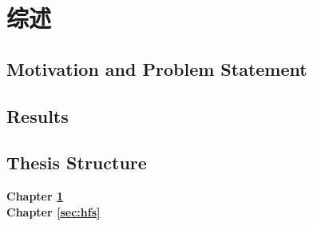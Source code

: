 \chapter{综述}
\label{sec:intro}


\section{Motivation and Problem Statement}
\label{sec:intro:motivation}


\section{Results}
\label{sec:intro:results}


\section{Thesis Structure}
\label{sec:intro:structure}

\textbf{Chapter \ref{sec:intro}} \\[0.2em]

\textbf{Chapter \ref{sec:hfs}} \\[0.2em]
